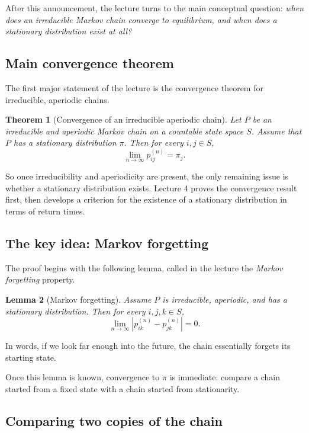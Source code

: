 \documentclass[11pt]{article}
\newtheorem{theorem}{Theorem}[section]
\newtheorem{lemma}[theorem]{Lemma}
\theoremstyle{definition}
\begin{document}
After this announcement, the lecture turns to the main conceptual question: \emph{when does an irreducible Markov chain converge to equilibrium, and when does a stationary distribution exist at all?}

\subsection{Main convergence theorem}

The first major statement of the lecture is the convergence theorem for irreducible, aperiodic chains.

\begin{theorem}[Convergence of an irreducible aperiodic chain]
Let \(P\) be an irreducible and aperiodic Markov chain on a countable state space \(S\). Assume that \(P\) has a stationary distribution \(\pi\). Then for every \(i,j\in S\),
\[
\lim_{n\to\infty} p_{ij}^{(n)}=\pi_j.
\]
\end{theorem}

So once irreducibility and aperiodicity are present, the only remaining issue is whether a stationary distribution exists. Lecture 4 proves the convergence result first, then develops a criterion for the existence of a stationary distribution in terms of return times.

\subsection{The key idea: Markov forgetting}

The proof begins with the following lemma, called in the lecture the \emph{Markov forgetting} property.

\begin{lemma}[Markov forgetting]
Assume \(P\) is irreducible, aperiodic, and has a stationary distribution. Then for every \(i,j,k\in S\),
\[
\lim_{n\to\infty} \left|p_{ik}^{(n)}-p_{jk}^{(n)}\right|=0.
\]
\end{lemma}

In words, if we look far enough into the future, the chain essentially forgets its starting state.

Once this lemma is known, convergence to \(\pi\) is immediate: compare a chain started from a fixed state with a chain started from stationarity.

\subsection{Comparing two copies of the chain}
\end{document}
